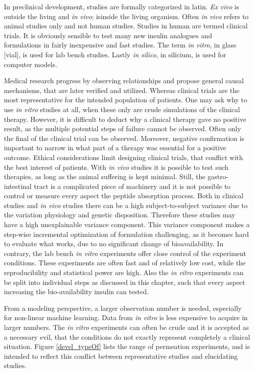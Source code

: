 In preclinical development, studies are formally categorized in latin. \textit{Ex vivo} is outside the living and \textit{in vivo}; isinside the living organism. Often \textit{in vivo} refers to animal studies only and not human studies. Studies in human are termed clinical trials. It is obviously sensible to test many new insulin analogues and formulations in fairly inexpensive and fast studies. The term \textit{in vitro}, in glass [vial], is used for lab bench studies. Lastly \textit{in silico}, in silicium, is used for computer models.
 
Medical research progress by observing relationships and propose general causal mechanisms, that are later verified and utilized. Whereas clinical trials are the most representative for the intended population of patients. One may ask why to use \textit{in vitro} studies at all, when these only are crude simulations of the clinical therapy. However, it is difficult to deduct why a clinical therapy gave no positive result, as the multiple potential steps of failure cannot be observed. Often only the final of the clinical trial can be observed. Moreover, negative confirmation is important to narrow in what part of a therapy was essential for a positive outcome. Ethical considerations limit designing clinical trials, that conflict with the best interest of patients. With \textit{in vivo} studies it is possible to test such therapies, as long as the animal suffering is kept minimal. Still, the gastro-intestinal tract is a complicated piece of machinery and it is not possible to control or measure every aspect the peptide absorption process. Both in clinical studies and \textit{in vivo} studies there can be a high subject-to-subject variance due to the variation physiology and genetic disposition. Therefore these studies may have a high unexplainable variance component. This variance component makes a step-wise incremental optimization of formulation challenging, as it becomes hard to evaluate what works, due to no significant change of bioavailability. In contrary, the lab bench \textit{in vitro} experiments offer close control of the experiment conditions. These experiments are often fast and of relatively low cost, while the reproducibility and statistical power are high. Also the \textit{in vitro} experiments can be split into individual steps as discussed in this chapter, such that every aspect increasing the bio-availability insulin can tested.

From a modeling perspective, a larger observation number is needed, especially for non-linear machine learning. Data from \textit{in vitro} is less expensive to acquire in larger numbers. The \textit{in vitro} experiments can often be crude and it is accepted as a necessary evil, that the conditions do not exactly represent completely a clinical situation. Figure \ref{devel_typeOf} lists the range of permeation experiments, and is intended to reflect this conflict between representative studies and elucidating studies.

